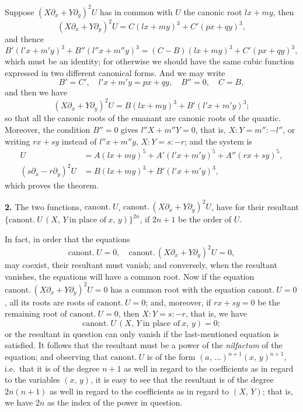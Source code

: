 \documentclass[11pt,a4paper]{article}
\theoremstyle{plain}
\begin{document}
Suppose $(X\partial_x + Y\partial_y)^2 U$ has in common with $U$ the canonic root $lx + my$, then
\[
(X\partial_x + Y\partial_y)^2 U = C(lx + my)^3 + C'(px + qy)^3,
\]
and thence
\[
B'(l'x + m'y)^3 + B''(l''x + m''y)^3 = (C - B)(lx + my)^3 + C'(px + qy)^3,
\]
which must be an identity; for otherwise we should have the same cubic function expressed in two different canonical forms. And we may write
\[
B' = C',\quad l'x + m'y = px + qy,\quad B'' = 0,\quad C = B,
\]
and then we have
\[
(X\partial_x + Y\partial_y)^2 U = B(lx + my)^3 + B'(l'x + m'y)^3;
\]
so that all the canonic roots of the emanant are canonic roots of the quantic. Moreover, the condition $B'' = 0$ gives $l''X + m''Y = 0$, that is, $X : Y = m'' : -l''$, or writing $rx + sy$ instead of $l''x + m''y$, $X : Y = s : -r$; and the system is
\begin{align*}
U &= A(lx + my)^5 + A'(l'x + m'y)^5 + A''(rx + sy)^5, \\
(s\partial_x - r\partial_y)^2 U &= B(lx + my)^3 + B'(l'x + m'y)^3,
\end{align*}
which proves the theorem.

\medskip

\noindent\textbf{2.} The two functions, $\text{canont.}\ U$, $\text{canont.}\,(X\partial_x + Y\partial_y)^2 U$, have for their resultant $\{\text{canont.}\ U\,(X,\,Y\ \text{in place of}\ x,\,y)\}^{2n}$, if $2n + 1$ be the order of $U$.

In fact, in order that the equations
\[
\text{canont.}\ U = 0,\quad \text{canont.}\,(X\partial_x + Y\partial_y)^2 U = 0,
\]
\newpage
may coexist, their resultant must vanish; and conversely, when the resultant vanishes, the equations will have a common root. Now if the equation $\text{canont.}\,(X\partial_x + Y\partial_y)^2 U = 0$ has a common root with the equation $\text{canont.}\ U = 0$, all its roots are roots of $\text{canont.}\ U = 0$; and, moreover, if $rx + sy = 0$ be the remaining root of $\text{canont.}\ U = 0$, then $X : Y = s : -r$, that is, we have
\[
\text{canont.}\ U\,(X,\,Y\ \text{in place of}\ x,\,y) = 0;
\]
or the resultant in question can only vanish if the last-mentioned equation is satisfied. It follows that the resultant must be a power of the \textit{nilfactum} of the equation; and observing that $\text{canont.}\ U$ is of the form $(a,\,\ldots)^{n+1}(x,\,y)^{n+1}$, i.e.\ that it is of the degree $n+1$ as well in regard to the coefficients as in regard to the variables $(x,\,y)$, it is easy to see that the resultant is of the degree $2n(n+1)$ as well in regard to the coefficients as in regard to $(X,\,Y)$; that is, we have $2n$ as the index of the power in question.
\end{document}
